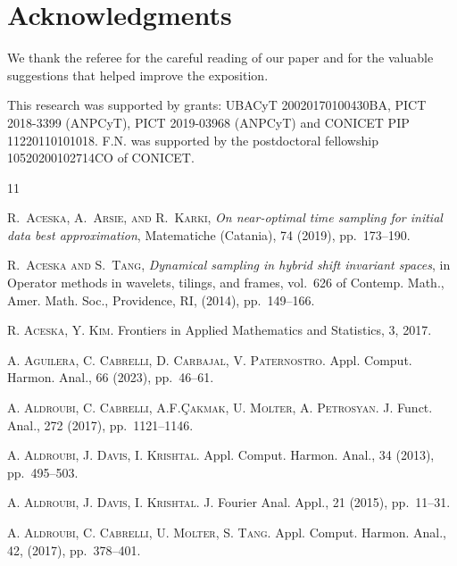 \documentclass[a4paper,12pt]{amsart}
\theoremstyle{definition}
\begin{document}
\section*{Acknowledgments}
We thank the referee for the careful reading of our paper and for the valuable suggestions that helped improve the exposition.

This research was supported by grants: UBACyT 20020170100430BA, PICT 2018-3399 (ANPCyT), PICT 2019-03968 (ANPCyT) and CONICET PIP 11220110101018. F.N. was supported by the postdoctoral fellowship 10520200102714CO of CONICET.


\begin{thebibliography}{11}

\textsc {R.~Aceska, A.~Arsie, and R.~Karki}, {\em On near-optimal time sampling for initial data best approximation}, Matematiche (Catania), 74 (2019), pp.~173--190.


\textsc {R.~Aceska and S.~Tang},
 {\em Dynamical sampling in hybrid shift invariant spaces}, in Operator methods in wavelets, tilings, and frames, vol.~626 of Contemp. Math., Amer. Math. Soc., Providence, RI, (2014), pp.~149--166.



\textsc{R. Aceska, Y. Kim.}
Frontiers in Applied Mathematics and Statistics, 3, 2017.

\textsc{A. Aguilera, C. Cabrelli, D. Carbajal, V. Paternostro.}
Appl. Comput. Harmon. Anal., 66 (2023), pp.~46--61.

\textsc{A. Aldroubi, C. Cabrelli, A.F.\c{C}akmak, U. Molter, A. Petrosyan.}
J. Funct. Anal., 272 (2017), pp.~1121--1146.

\textsc{A. Aldroubi, J. Davis, I. Krishtal.}
Appl. Comput. Harmon. Anal., 34 (2013),  pp.~495--503.

\textsc{A. Aldroubi, J. Davis, I. Krishtal.}
J. Fourier Anal. Appl., 21 (2015), pp.~11--31.

\textsc{A. Aldroubi, C. Cabrelli, U. Molter, S. Tang.}
Appl. Comput. Harmon. Anal., 42, (2017), pp.~378--401.


\end{thebibliography}
\end{document}
